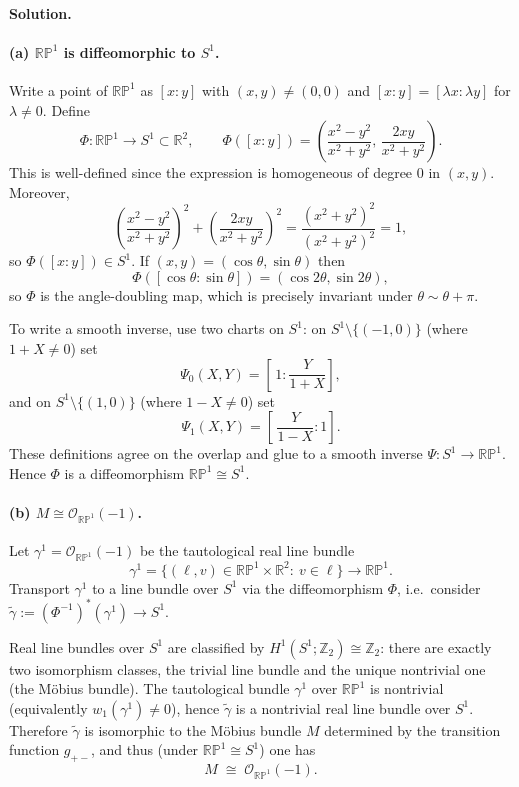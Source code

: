 \documentclass[12pt,a4paper]{article}
\theoremstyle{plain}
\theoremstyle{definition}      %
\begin{document}
\paragraph{\textbf{Solution.}}

\paragraph{(a) $\mathbb{RP}^1$ is diffeomorphic to $S^1$.}
Write a point of $\mathbb{RP}^1$ as $[x:y]$ with $(x,y)\neq (0,0)$ and $[x:y]=[\lambda x:\lambda y]$
for $\lambda\neq 0$.
Define
\[
\Phi:\mathbb{RP}^1 \longrightarrow S^1\subset\mathbb{R}^2,\qquad
\Phi([x:y])=\left(\frac{x^2-y^2}{x^2+y^2},\,\frac{2xy}{x^2+y^2}\right).
\]
This is well-defined since the expression is homogeneous of degree $0$ in $(x,y)$.
Moreover,
\[
\left(\frac{x^2-y^2}{x^2+y^2}\right)^2+\left(\frac{2xy}{x^2+y^2}\right)^2
=\frac{(x^2+y^2)^2}{(x^2+y^2)^2}=1,
\]
so $\Phi([x:y])\in S^1$. If $(x,y)=(\cos\theta,\sin\theta)$ then
\[
\Phi([\cos\theta:\sin\theta])=(\cos 2\theta,\sin 2\theta),
\]
so $\Phi$ is the angle-doubling map, which is precisely invariant under $\theta\sim\theta+\pi$.

To write a smooth inverse, use two charts on $S^1$:
on $S^1\setminus\{(-1,0)\}$ (where $1+X\neq 0$) set
\[
\Psi_0(X,Y)=\left[\,1:\frac{Y}{1+X}\right],
\]
and on $S^1\setminus\{(1,0)\}$ (where $1-X\neq 0$) set
\[
\Psi_1(X,Y)=\left[\,\frac{Y}{1-X}:1\right].
\]
These definitions agree on the overlap and glue to a smooth inverse $\Psi:S^1\to \mathbb{RP}^1$.
Hence $\Phi$ is a diffeomorphism $\mathbb{RP}^1\cong S^1$.

\paragraph{(b) $M \cong \mathcal{O}_{\mathbb{RP}^1}(-1)$.}
Let $\gamma^1=\mathcal{O}_{\mathbb{RP}^1}(-1)$ be the tautological real line bundle
\[
\gamma^1=\{(\ell,v)\in\mathbb{RP}^1\times\mathbb{R}^2:\ v\in \ell\}\longrightarrow \mathbb{RP}^1.
\]
Transport $\gamma^1$ to a line bundle over $S^1$ via the diffeomorphism $\Phi$, i.e.\ consider
$\widetilde{\gamma}:=(\Phi^{-1})^*(\gamma^1)\to S^1$.

Real line bundles over $S^1$ are classified by $H^1(S^1;\mathbb{Z}_2)\cong \mathbb{Z}_2$:
there are exactly two isomorphism classes, the trivial line bundle and the unique nontrivial one (the Möbius bundle).
The tautological bundle $\gamma^1$ over $\mathbb{RP}^1$ is nontrivial (equivalently $w_1(\gamma^1)\neq 0$),
hence $\widetilde{\gamma}$ is a nontrivial real line bundle over $S^1$.
Therefore $\widetilde{\gamma}$ is isomorphic to the Möbius bundle $M$ determined by the transition
function $g_{+-}$, and thus (under $\mathbb{RP}^1\cong S^1$) one has
\[
M \;\cong\; \mathcal{O}_{\mathbb{RP}^1}(-1).
\]
\end{document}
